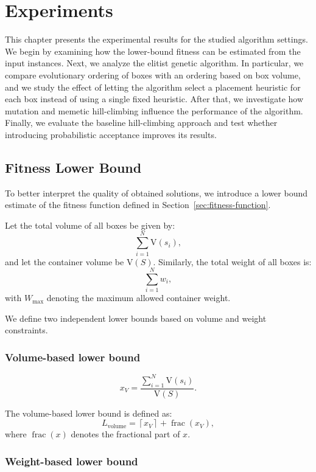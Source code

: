 \chapter{Experiments}
\label{chap:experiments}

This chapter presents the experimental results for the studied algorithm settings. 
We begin by examining how the lower-bound fitness can be estimated from the input instances. 
Next, we analyze the elitist genetic algorithm. In particular, we compare evolutionary ordering of boxes with an ordering based on box volume, 
and we study the effect of letting the algorithm select a placement heuristic for each box instead of using a single fixed heuristic. 
After that, we investigate how mutation and memetic hill-climbing influence the performance of the algorithm. 
Finally, we evaluate the baseline hill-climbing approach and test whether introducing probabilistic acceptance improves its results.

\section{Fitness Lower Bound}

To better interpret the quality of obtained solutions, we introduce a lower bound estimate of the fitness function defined in Section~\ref{sec:fitness-function}. 

Let the total volume of all boxes be given by:
\[
\sum_{i=1}^{N} \mathrm{V}(s_i),
\]
and let the container volume be $\mathrm{V}(S)$. 
Similarly, the total weight of all boxes is:
\[
\sum_{i=1}^{N} w_i,
\]
with $W_{\max}$ denoting the maximum allowed container weight.

We define two independent lower bounds based on volume and weight constraints.

\subsection*{Volume-based lower bound}

\[
x_V = \frac{\sum_{i=1}^{N} \mathrm{V}(s_i)}{\mathrm{V}(S)}.
\]

The volume-based lower bound is defined as:
\[
L_{\mathrm{volume}} = \left\lceil x_V \right\rceil + \operatorname{frac}(x_V),
\]
where $\operatorname{frac}(x)$ denotes the fractional part of $x$.

\subsection*{Weight-based lower bound}

